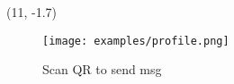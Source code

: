 

\begin{textblock}{0.5}(11, -1.7)
    \begin{figure}
    \texttt{[image: examples/profile.png]}
    \captionsetup[figure]{font=footnotesize}
    \captionsetup{width=3\linewidth}
    \caption{Scan QR to send msg}
    \end{figure}
\end{textblock}